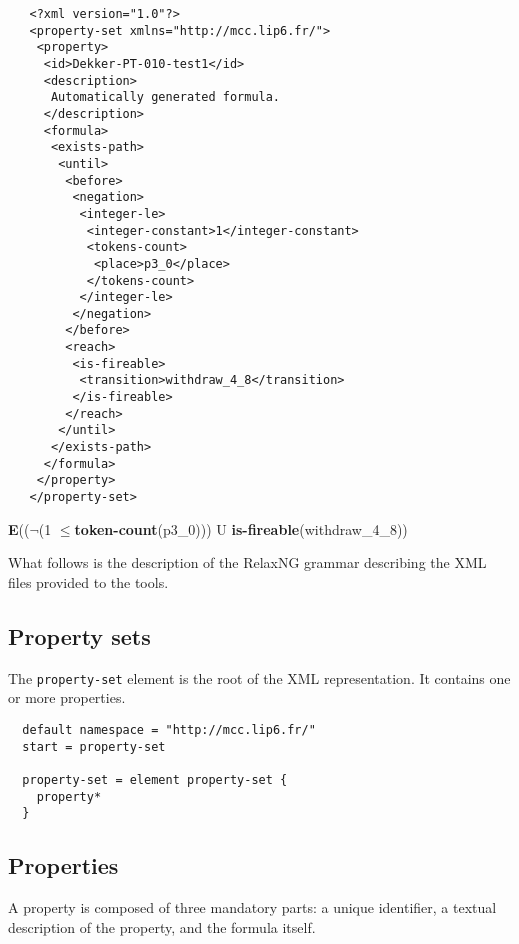 \documentclass[10pt,english,a4paper]{article}
\newcommand\ctle             {\textbf{E}\xspace}
\newcommand\logicnot         {\boldmath$\lnot$\xspace}
\newcommand\atomleq          {\boldmath$\leq$\xspace}
\newcommand\atomisfire[1]    {\textbf{is-fireable}(#1)}
\newcommand\atomtokenscnt[1] {\textbf{token-count}(#1)}
\begin{document}
\begin{multicols}{2}
\begin{lstlisting}
   <?xml version="1.0"?>
   <property-set xmlns="http://mcc.lip6.fr/">
    <property>
     <id>Dekker-PT-010-test1</id>
     <description>
      Automatically generated formula.
     </description>
     <formula>
      <exists-path>
       <until>
        <before>
         <negation>
          <integer-le>
           <integer-constant>1</integer-constant>
           <tokens-count>
            <place>p3_0</place>
           </tokens-count>
          </integer-le>
         </negation>
        </before>
        <reach>
         <is-fireable>
          <transition>withdraw_4_8</transition>
         </is-fireable>
        </reach>
       </until>
      </exists-path>
     </formula>
    </property>
   </property-set>
\end{lstlisting}
\columnbreak
\vspace*{2cm}
\ctle ((\logicnot (1 \atomleq \atomtokenscnt{p3\_0})) U \atomisfire{withdraw\_4\_8})
\end{multicols}

What follows is the description of the RelaxNG grammar describing the XML
files provided to the tools.

\subsection{Property sets}
The \lstinline[language=xsd]!property-set! element is the root of the XML representation.
It contains one or more properties.
\begin{lstlisting}
  default namespace = "http://mcc.lip6.fr/"
  start = property-set

  property-set = element property-set {
    property*
  }
\end{lstlisting}

\subsection{Properties}
A property is composed of three mandatory parts: a unique identifier, a textual description
of the property, and the formula itself.
\end{document}
